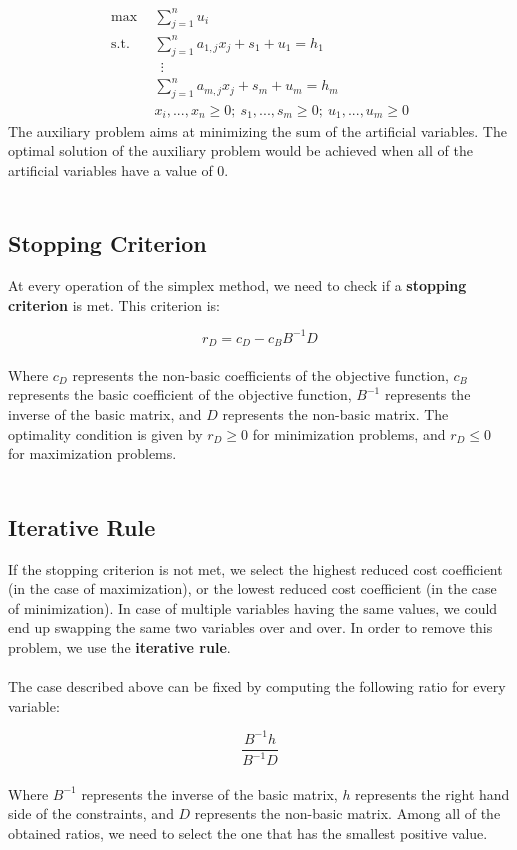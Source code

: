 \documentclass{article}
\begin{document}
\begin{align*}
	\max~~ & \sum_{j = 1}^n u_i \\
	\text{s.t.}~~ & \sum_{j = 1}^n a_{1,j}x_j+s_1+u_1 = h_1 \\
	~~&~~ \vdots \\
	~~& \sum_{j = 1}^n a_{m,j}x_j+s_m+u_m = h_m \\
	~~& x_i, ..., x_n \geq 0;~ s_1, ..., s_m \geq 0;~ u_1, ..., u_m \geq 0
\end{align*}
The auxiliary problem aims at minimizing the sum of the artificial variables. The optimal solution of the auxiliary problem would be achieved when all of the artificial variables have a value of 0. \\ \\

\subsection{Stopping Criterion}
At every operation of the simplex method, we need to check if a \textbf{stopping criterion} is met. This criterion is:

\[ r_D = c_D - c_BB^{-1}D \] \\
Where $c_D$ represents the non-basic coefficients of the objective function, $c_B$ represents the basic coefficient of the objective function, $B^{-1}$ represents the inverse of the basic matrix, and $D$ represents the non-basic matrix. The optimality condition is given by $r_D \geq 0$ for minimization problems, and $r_D \leq 0$ for maximization problems. \\ \\

\subsection{Iterative Rule}
If the stopping criterion is not met, we select the highest reduced cost coefficient (in the case of maximization), or the lowest reduced cost coefficient (in the case of minimization). In case of multiple variables having the same values, we could end up swapping the same two variables over and over. In order to remove this problem, we use the \textbf{iterative rule}. \\ \\
The case described above can be fixed by computing the following ratio for every variable:

\[ \frac{B^{-1}h}{B^{-1}D} \] \\
Where $B^{-1}$ represents the inverse of the basic matrix, $h$ represents the right hand side of the constraints, and $D$ represents the non-basic matrix. Among all of the obtained ratios, we need to select the one that has the smallest positive value.
\end{document}
